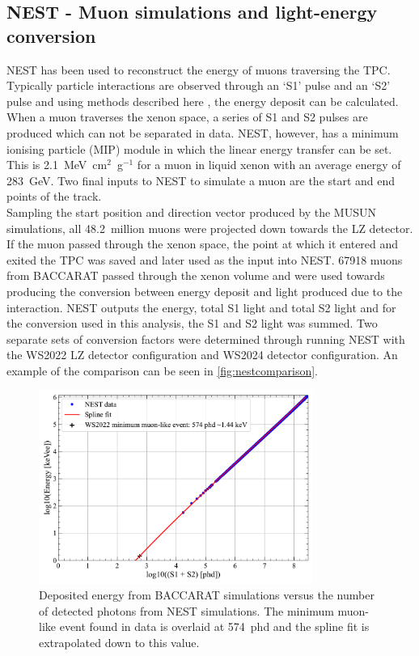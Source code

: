\subsection{NEST - Muon simulations and light-energy conversion}
NEST has been used to reconstruct the energy of muons traversing the TPC. Typically particle interactions are observed through an `S1' pulse and an `S2' pulse and using methods described here \cite{NEST1}, the energy deposit can be calculated. When a muon traverses the xenon space, a series of S1 and S2 pulses are produced which can not be separated in data. NEST, however, has a minimum ionising particle (MIP) module in which the linear energy transfer can be set. This is 2.1~MeV~cm$^2$~g$^{-1}$\cite{MUE} for a muon in liquid xenon with an average energy of 283~GeV. Two final inputs to NEST to simulate a muon are the start and end points of the track.\\
Sampling the start position and direction vector produced by the MUSUN simulations, all 48.2~million muons were projected down towards the LZ detector. If the muon passed through the xenon space, the point at which it entered and exited the TPC was saved and later used as the input into NEST. 67918 muons from BACCARAT passed through the xenon volume and were used towards producing the conversion between energy deposit and light produced due to the interaction. NEST outputs the energy, total S1 light and total S2 light and for the conversion used in this analysis, the S1 and S2 light was summed.
Two separate sets of conversion factors were determined through running NEST with the WS2022 LZ detector configuration and WS2024 detector configuration. An example of the comparison can be seen in \autoref{fig:nestcomparison}.
\begin{figure}[htbp]
    \centering
    \includegraphics[width=0.8\textwidth]{figures/Muons/TPCEnergyConversion.pdf}
    \caption{Deposited energy from BACCARAT simulations versus the number of detected photons from NEST simulations. The minimum muon-like event found in data is overlaid at 574~phd and the spline fit is extrapolated down to this value.}
    \label{fig:nestcomparison}
\end{figure}
